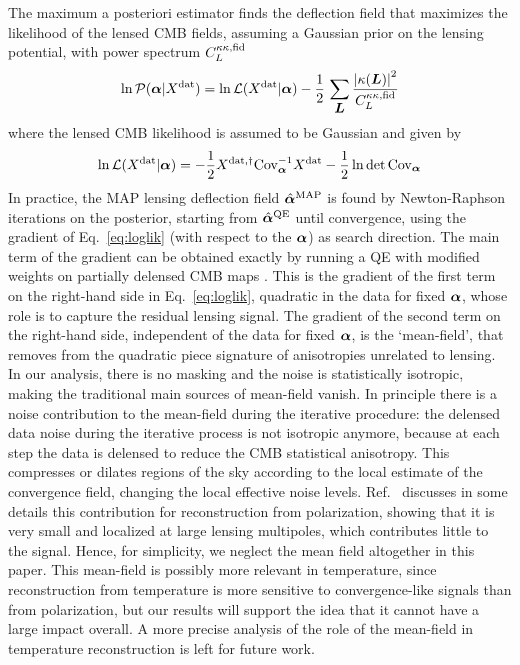 \documentclass[prd, superscriptaddress, tightenlines, longbibliography, nofootinbib, eqsecnum, amsfonts, amsmath, floatfix, twocolumn, notitlepage]{revtex4-2}
\newcommand{\Cov}[0]{ {\rm{Cov}} }
\begin{document}
The maximum a posteriori estimator finds the deflection field that maximizes the likelihood of the lensed CMB fields, assuming a Gaussian prior on the lensing potential, with power spectrum $C_L^{\kappa\kappa, \rm fid}$
\begin{equation}
    \ln \mathcal{P}({\boldsymbol{\alpha}} | X^{\rm dat}) = \ln \mathcal{L}( X^{\rm dat} | {\boldsymbol{\alpha}}) - \frac{1}{2} \, \sum_{\mbox{\boldmath{$L$}}} \frac{\left|\kappa({\mbox{\boldmath{$L$}}})\right|^2}{C_L^{\kappa\kappa, \rm fid}}
\end{equation}
where the lensed CMB likelihood is assumed to be Gaussian and given by 
\begin{equation}\label{eq:loglik}
    \ln \mathcal{L}( X^{\rm dat} | \valpha) = -\frac{1}{2} X^{\rm dat, \dagger }\Cov_\valpha^{-1} X^{\rm dat} - \frac{1}{2}\ln \det \Cov_\valpha
\end{equation}
In practice, the MAP lensing deflection field $\hat {{\boldsymbol{\alpha}}}^{\rm MAP}$ is found by Newton-Raphson iterations on the posterior, starting from $\hat {{\boldsymbol{\alpha}}}^{\rm QE}$ until convergence, using the gradient of Eq.~\ref{eq:loglik} (with respect to the ${\boldsymbol{\alpha}}$) as search direction. The main term of the gradient can be obtained exactly by running a QE with modified weights on partially delensed CMB maps  \cite[see][for more details]{Carron:2017mqf}. This is the gradient of the first term on the right-hand side in Eq.~\ref{eq:loglik}, quadratic in the data for fixed ${\boldsymbol{\alpha}}$, whose role is to capture the residual lensing signal. The gradient of the second term on the right-hand side, independent of the data for fixed ${\boldsymbol{\alpha}}$, is the `mean-field', that removes from the quadratic piece signature of anisotropies unrelated to lensing. In our analysis, there is no masking and the noise is statistically isotropic, making the traditional main sources of mean-field vanish. In principle there is a noise contribution to the mean-field during the iterative procedure: the delensed data noise during the iterative process is not isotropic anymore, because at each step the data is delensed to reduce the CMB statistical anisotropy. This compresses or dilates regions of the sky according to the local estimate of the convergence field, changing the local effective noise levels. Ref.~\cite{Belkner:2023duz} discusses in some details this contribution for reconstruction from polarization, showing that it is very small and localized at large lensing multipoles, which contributes little to the signal. Hence, for simplicity, we neglect the mean field altogether in this paper. This mean-field is possibly more relevant in temperature, since reconstruction from temperature is more sensitive to convergence-like signals than from polarization, but our results will support the idea that it cannot have a large impact overall. A more precise analysis of the role of the mean-field in temperature reconstruction is left for future work.
\end{document}
